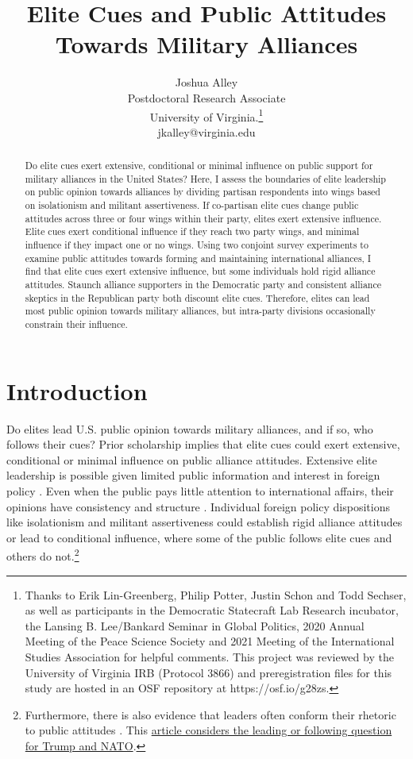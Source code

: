\documentclass[12pt]{article}
\title{\textbf{Elite Cues and Public Attitudes Towards Military Alliances}}
\author{Joshua Alley \\
Postdoctoral Research Associate \\
University of Virginia.\thanks{Thanks to Erik Lin-Greenberg, Philip Potter, Justin Schon and Todd Sechser, as well as participants in the Democratic Statecraft Lab Research incubator, the Lansing B. Lee/Bankard Seminar in Global Politics, 2020 Annual Meeting of the Peace Science Society and 2021 Meeting of the International Studies Association for helpful comments. 
This project was reviewed by the University of Virginia IRB (Protocol 3866) and preregistration files for this study are hosted in an OSF repository at https://osf.io/g28zs.} \\
jkalley@virginia.edu
}
\date{}
\begin{document}
\maketitle 

\doublespace 

\begin{abstract}
Do elite cues exert extensive, conditional or minimal influence on public support for military alliances in the United States? 
Here, I assess the boundaries of elite leadership on public opinion towards alliances by dividing partisan respondents into wings based on isolationism and militant assertiveness.
If co-partisan elite cues change public attitudes across three or four wings within their party, elites exert extensive influence. 
Elite cues exert conditional influence if they reach two party wings, and minimal influence if they impact one or no wings.
Using two conjoint survey experiments to examine public attitudes towards forming and maintaining international alliances, I find that elite cues exert extensive influence, but some individuals hold rigid alliance attitudes. 
Staunch alliance supporters in the Democratic party and consistent alliance skeptics in the Republican party both discount elite cues.  
Therefore, elites can lead most public opinion towards military alliances, but intra-party divisions occasionally constrain their influence.  
\end{abstract}


\newpage 


\section{Introduction}


Do elites lead U.S. public opinion towards military alliances, and if so, who follows their cues?
Prior scholarship implies that elite cues could exert extensive, conditional or minimal influence on public alliance attitudes.
Extensive elite leadership is possible given limited public information and interest in foreign policy \citep{Canes-Wrone2006, BaumPotter2008, Druckman2014}.
Even when the public pays little attention to international affairs, their opinions have consistency and structure \citep{Holsti1992, PageShapiro1992}.
Individual foreign policy dispositions like isolationism and militant assertiveness \citep{Herrmannetal1999, KertzerZeitzoff2017} could establish rigid alliance attitudes or lead to conditional influence, where some of the public follows elite cues and others do not.\footnote{Furthermore, there is also evidence that leaders often conform their rhetoric to public attitudes \citep{Barberaetal2019, HagerHilbig2020}. This \href{https://fivethirtyeight.com/features/is-trump-fueling-republicans-concerns-about-nato-or-echoing-them/}{article considers the leading or following question for Trump and NATO}.}
\end{document}
